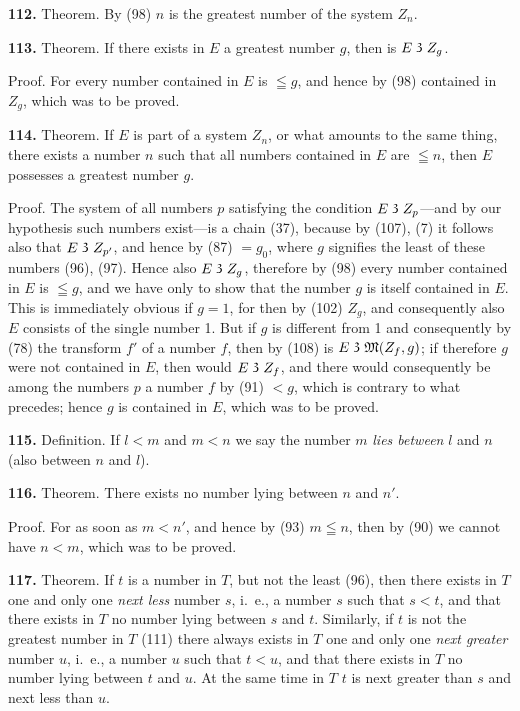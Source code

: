 \documentclass[oneside]{book}
\newcommand\partof{\mathrel{\raisebox{0.45ex}{$\mathfrak{3}$}}}   %
\newcommand\mypara{\medskip\textbf}
\begin{document}
\mypara{112.} Theorem.  By (98) $n$ is the greatest number
of the system $Z_n$.

\mypara{113.} Theorem. If there exists in $E$ a greatest
number $g$, then is $E \partof Z_g$.

Proof.  For every number contained in $E$ is $\leqq g$,
and hence by (98) contained in $Z_g$, which was to be
proved.

\mypara{114.} Theorem.  If $E$ is part of a system $Z_n$, or
what amounts to the same thing, there exists a number
$n$ such that all numbers contained in $E$ are $\leqq n$,
then $E$ possesses a greatest number $g$.

Proof. The system of all numbers $p$ satisfying
the condition $E \partof Z_p$---and by our hypothesis such
numbers exist---is a chain (37), because by (107),
(7) it follows also that $E \partof Z_{p'}$, and hence by (87) $=g_0$,
where $g$ signifies the least of these numbers (96), (97).
Hence also $E \partof Z_g$, therefore by (98) every number contained
in $E$ is $\leqq g$, and we have only to show that the
number $g$ is itself contained in $E$. This is immediately
obvious if $g=1$, for then by (102) $Z_g$, and consequently
also $E$ consists of the single number 1. But if $g$ is
different from 1 and consequently by (78) the transform
$f'$ of a number $f$, then by (108) is $E \partof \mathfrak{M}(Z_f,g)$;
if therefore $g$ were not contained in $E$, then would
$E \partof Z_f$, and there would consequently be among the
numbers $p$ a number $f$ by (91) $<g$, which is contrary
to what precedes; hence $g$ is contained in $E$, which
was to be proved.

\mypara{115.} Definition.  If $l<m$ and $m<n$ we say the
number $m$ \textit{lies between} $l$ and $n$ (also between $n$ and $l$).

\mypara{116.} Theorem.  There exists no number lying between
$n$ and $n'$.

Proof.  For as soon as $m < n'$, and hence by (93)
$m\leqq n$, then by (90) we cannot have $n<m$, which was
to be proved.

\mypara{117.} Theorem. If $t$ is a number in $T$, but not the
least (96), then there exists in $T$ one and only one
\textit{next less} number $s$, i.~e., a number $s$ such that $s<t$,
and that there exists in $T$ no number lying between $s$
and $t$. Similarly, if $t$ is not the greatest number in $T$
(111) there always exists in $T$ one and only one \textit{next
greater} number $u$, i.~e., a number $u$ such that $t<u$,
and that there exists in $T$ no number lying between $t$
and $u$. At the same time in $T$ $t$ is next greater than $s$
and next less than $u$.
\end{document}
